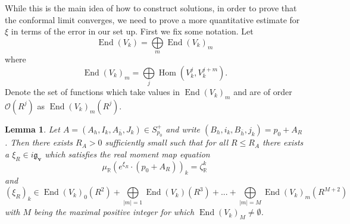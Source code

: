 \documentclass[12pt,oneside,reqno]{amsart}
\newtheorem{lemma}[theorem]{Lemma}
\theoremstyle{definition}
\numberwithin{equation}{section}
\numberwithin{theorem}{section}
\newcommand{\R}{\mathbb{R}}
\newcommand{\End}{\operatorname{End}}
\newcommand{\Hom}{\operatorname{Hom}}
\begin{document}
While this is the main idea of how to construct solutions, in order to prove that the conformal limit converges, we need to prove a more quantitative estimate for $\xi$ in terms of the error in our set up. First we fix some notation. Let 
%
\begin{equation}
\End(V_k) = \bigoplus\limits_{m} \End(V_k)_m
\end{equation}
%
where 
%
\begin{equation}
\End(V_k)_m = \bigoplus\limits_j \Hom (V_k^j, V_k^{j+m}). 
\end{equation}
%
Denote the set of functions which take values in $\End(V_k)_m$ and are of order $\mathcal O(R^j)$ as $\End(V_k)_m(R^j)$. 
%
\begin{lemma}\label{metric}
Let $A= (A_h,I_k,A_{\bar h}, J_k) \in S_{p_0}^+$ and write $(B_h,i_k,B_{\bar h},j_k) = p_0 +A_R$. Then there exists $R_A>0$ sufficiently small such that for all $R\le R_A$ there exists a $\xi_R \in i\mathfrak g_{\mathbf{v}}$ which satisfies the real moment map equation 
%
\begin{equation}
\mu_{\R}(e^{\xi_R}\cdot(p_0+A_R))_k = \zeta_{\R}^k
\end{equation}
%
and 
%
\begin{equation}\label{metricansatz}
(\xi_R)_k \in \End(V_k)_0(R^2) + \bigoplus\limits_{|m|= 1}\End(V_k)(R^3)+ ... + \bigoplus\limits_{|m|= M} \End(V_k)_m(R^{M+2})
\end{equation}
%
with $M$ being the maximal positive integer for which $\End(V_k)_M \neq \emptyset$.
\end{lemma}
%
\end{document}
